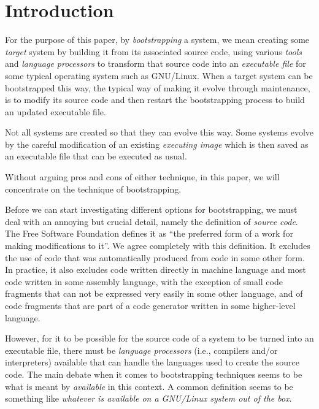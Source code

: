 \section{Introduction}
\label{sec-introduction}

For the purpose of this paper, by \emph{bootstrapping} a \commonlisp{}
system, we mean creating some \emph{target} \commonlisp{} system by
building it from its associated source code, using various
\emph{tools} and \emph{language processors} to transform that source
code into an \emph{executable file} for some typical operating system
such as GNU/Linux.  When a target \commonlisp{} system can be
bootstrapped this way, the typical way of making it evolve through
maintenance, is to modify its source code and then restart the
bootstrapping process to build an updated executable file.

Not all \commonlisp{} systems are created so that they can evolve this
way.  Some systems evolve by the careful modification of an existing
\emph{executing image} which is then saved as an executable file that
can be executed as usual.

Without arguing pros and cons of either technique, in this paper, we
will concentrate on the technique of bootstrapping.

Before we can start investigating different options for bootstrapping,
we must deal with an annoying but crucial detail, namely the
definition of \emph{source code}.  The Free Software Foundation
defines it as ``the preferred form of a work for making modifications
to it''.  We agree completely with this definition.  It excludes the
use of code that was automatically produced from code in some other
form.  In practice, it also excludes code written directly in machine
language and most code written in some assembly language, with the
exception of small code fragments that can not be expressed very
easily in some other language, and of code fragments that are part of
a code generator written in some higher-level language.

However, for it to be possible for the source code of a \commonlisp{}
system to be turned into an executable file, there must be
\emph{language processors} (i.e., compilers and/or interpreters)
available that can handle the languages used to create the source
code.  The main debate when it comes to bootstrapping techniques seems
to be what is meant by \emph{available} in this context.  A common
definition seems to be something like \emph{whatever is available on a
  GNU/Linux system out of the box}.

